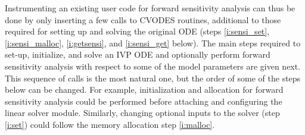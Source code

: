 Instrumenting an existing user code for forward sensitivity analysis can 
thus be done by only inserting a few calls to CVODES routines, additional
to those required for setting up and solving the original ODE
(steps \ref{i:sensi_set}, \ref{i:sensi_malloc}, \ref{i:getsensi}, 
and \ref{i:sensi_get} below).
The main steps required to set-up, initialize, and solve an IVP ODE and
optionally perform forward sensitivity analysis with respect to some of
the model parameters are given next. This sequence of calls is the most
natural one, but the order of some of the steps below can be changed. 
For example, initialization and allocation for forward sensitivity analysis 
could be performed before attaching and configuring the linear solver module.
Similarly, changing optional inputs to the solver (step \ref{i:set}) could
follow the memory allocation step \ref{i:malloc}.
%
